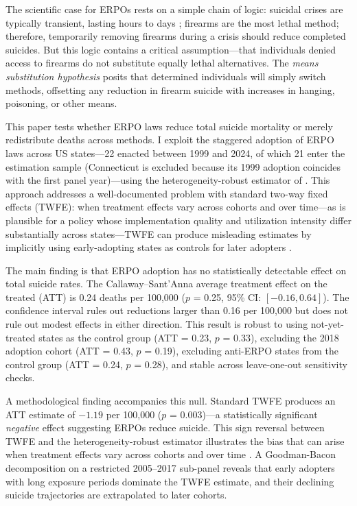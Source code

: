 \documentclass[12pt]{article}
\begin{document}
The scientific case for ERPOs rests on a simple chain of logic: suicidal crises are typically transient, lasting hours to days \citep{owens2002fatal}; firearms are the most lethal method; therefore, temporarily removing firearms during a crisis should reduce completed suicides. But this logic contains a critical assumption---that individuals denied access to firearms do not substitute equally lethal alternatives. The \textit{means substitution hypothesis} posits that determined individuals will simply switch methods, offsetting any reduction in firearm suicide with increases in hanging, poisoning, or other means.

This paper tests whether ERPO laws reduce total suicide mortality or merely redistribute deaths across methods. I exploit the staggered adoption of ERPO laws across US states---22 enacted between 1999 and 2024, of which 21 enter the estimation sample (Connecticut is excluded because its 1999 adoption coincides with the first panel year)---using the heterogeneity-robust estimator of \citet{callaway2021difference}. This approach addresses a well-documented problem with standard two-way fixed effects (TWFE): when treatment effects vary across cohorts and over time---as is plausible for a policy whose implementation quality and utilization intensity differ substantially across states---TWFE can produce misleading estimates by implicitly using early-adopting states as controls for later adopters \citep{goodmanbacon2021difference, dechaisemartin2020two}.

The main finding is that ERPO adoption has no statistically detectable effect on total suicide rates. The Callaway--Sant'Anna average treatment effect on the treated (ATT) is 0.24 deaths per 100,000 ($p$ = 0.25, 95\% CI: $[-0.16, 0.64]$). The confidence interval rules out reductions larger than 0.16 per 100,000 but does not rule out modest effects in either direction. This result is robust to using not-yet-treated states as the control group (ATT = 0.23, $p$ = 0.33), excluding the 2018 adoption cohort (ATT = 0.43, $p$ = 0.19), excluding anti-ERPO states from the control group (ATT = 0.24, $p$ = 0.28), and stable across leave-one-out sensitivity checks.

A methodological finding accompanies this null. Standard TWFE produces an ATT estimate of $-1.19$ per 100,000 ($p$ = 0.003)---a statistically significant \textit{negative} effect suggesting ERPOs reduce suicide. This sign reversal between TWFE and the heterogeneity-robust estimator illustrates the bias that can arise when treatment effects vary across cohorts and over time \citep{roth2023s, borusyak2024revisiting}. A Goodman-Bacon decomposition on a restricted 2005--2017 sub-panel reveals that early adopters with long exposure periods dominate the TWFE estimate, and their declining suicide trajectories are extrapolated to later cohorts.
\end{document}
